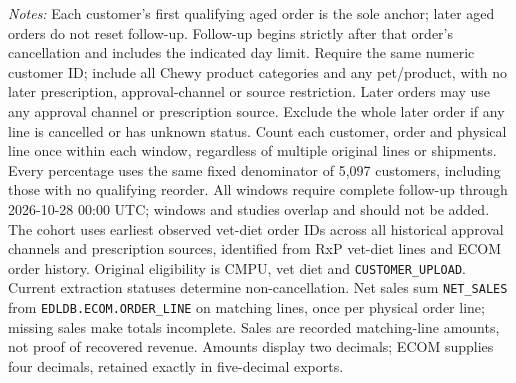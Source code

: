 \begin{table}[!htbp]
\begin{minipage}{\linewidth}
\footnotesize
\textit{Notes:} Each customer's first qualifying aged order is the sole anchor;
later aged orders do not reset follow-up. Follow-up begins strictly after that
order's cancellation and includes the indicated day limit. Require the same numeric customer ID; include all Chewy product categories and any pet/product, with no later prescription, approval-channel or source restriction. Later orders may use any approval channel or prescription
source. Exclude the whole later order if any line is cancelled or has unknown
status. Count each customer, order and physical line once within each window,
regardless of multiple original lines or shipments. Every percentage uses the
same fixed denominator of 5,097 customers, including those with no
qualifying reorder. All windows require complete follow-up through
2026-10-28 00:00 UTC; windows and studies overlap and should not be added.
The cohort uses earliest observed vet-diet order IDs across all historical approval channels and prescription sources, identified from RxP vet-diet lines and ECOM order history. Original eligibility is CMPU,
vet diet and \texttt{CUSTOMER\_UPLOAD}. Current extraction statuses determine
non-cancellation. Net sales sum \texttt{NET\_SALES} from \texttt{EDLDB.ECOM.ORDER\_LINE} on matching
lines, once per physical order line; missing sales make totals incomplete.
Sales are recorded matching-line amounts, not proof of recovered revenue.
Amounts display two decimals; ECOM supplies four decimals, retained exactly in five-decimal exports.
\end{minipage}
\end{table}
